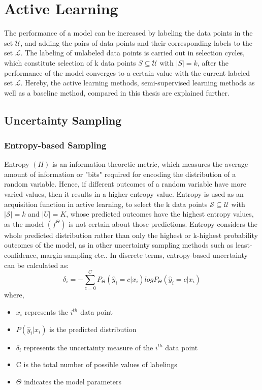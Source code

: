 \section{Active Learning}\label{section:active_learning}
The performance of a model can be increased by labeling the data points in the set $\mathcal{U}$, and adding the pairs of data points and their corresponding labels to the set $\mathcal{L}$. The labeling of unlabeled data points is carried out in selection cycles, which constitute selection of k data points $S \subseteq \mathcal{U}$ with $|S| = k$, after the performance of the model converges to a certain value with the current labeled set $\mathcal{L}$. Hereby, the active learning methods, semi-supervised learning methods as well as a baseline method, compared in this thesis are explained further.

\subsection{Uncertainty Sampling}

\subsubsection{Entropy-based Sampling\cite{settles2009}}
Entropy\cite{shannon1948} $(H)$ is an information theoretic metric, which measures the average amount of information or "bits" required for encoding the distribution of a random variable. Hence, if different outcomes of a random variable have more varied values, then it results in a higher entropy value. Entropy is used as an acquisition function in active learning, to select the k data points $\mathcal{S} \subseteq \mathcal{U}$ with $|\mathcal{S}| = k$ and $|U| = K$, whose predicted outcomes have the highest entropy values, as the model $(f^\Theta)$ is not certain about those predictions. Entropy considers the whole predicted distribution rather than only the highest or k-highest probability outcomes of the model, as in other uncertainty sampling methods such as least-confidence, margin sampling etc.\cite{settles2009}. In discrete terms, entropy-based uncertainty can be calculated as:
\begin{equation}
    \label{equation:entropy_sampling}
    \delta_{i} = - \sum_{c=0}^{C} P_{\Theta}(\hat{y}_i = c|x_i)logP_{\Theta}(\hat{y}_i = c|x_i)
\end{equation}
where,
\begin{itemize}[label={}]
  \setlength\itemsep{0em}
  \item $x_i$ represents the $i^{th}$ data point
  \item $P(\hat{y}_i|x_i)$ is the predicted distribution
  \item $\delta_{i}$ represents the uncertainty measure of the $i^{th}$ data point
  \item C is the total number of possible values of labelings
  \item $\Theta$ indicates the model parameters
\end{itemize}

